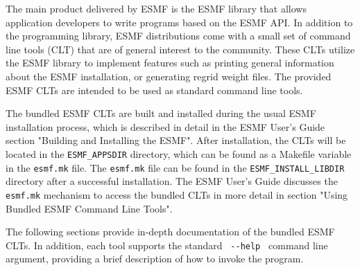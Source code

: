 
The main product delivered by ESMF is the ESMF library that allows application
developers to write programs based on the ESMF API. In addition to the 
programming library, ESMF distributions come with a small set of command line
tools (CLT) that are of general interest to the community. These CLTs utilize
the ESMF library to implement features such as printing general information
about the ESMF installation, or generating regrid weight files. The provided
ESMF CLTs are intended to be used as standard command line tools.

The bundled ESMF CLTs are built and installed during the usual ESMF 
installation process, which is described in detail in the ESMF User's Guide 
section "Building and Installing the ESMF". After installation, the
CLTs will be located in the {\tt ESMF\_APPSDIR} directory, which can 
be found as a Makefile variable in the {\tt esmf.mk} file. The {\tt esmf.mk} 
file can be found in the {\tt ESMF\_INSTALL\_LIBDIR} directory after a 
successful installation.  The ESMF User's Guide discusses the {\tt esmf.mk} 
mechanism to access the bundled CLTs in more detail in section 
"Using Bundled ESMF Command Line Tools".

The following sections provide in-depth documentation of the bundled ESMF 
CLTs. In addition, each tool supports the standard 
\verb+ --help + command line argument, providing a brief description of how 
to invoke the program.

